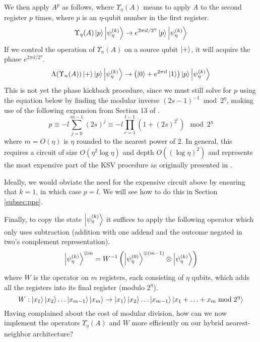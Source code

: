 We then apply $A^p$ as follows, where $\Upsilon_{\eta}(A)$ means to
apply $A$ to the second register $p$ times, where $p$ is an $\eta$-qubit
number in the first register.
%
\begin{equation}
\Upsilon_{\eta}(A) \left\vert{p}\right\rangle\left\vert{\psi_{\eta}^{(k)}}\right\rangle \rightarrow
e^{2\pi i l/2^{\eta}} \left\vert{p}\right\rangle\left\vert{\psi_{\eta}^{(k)}}\right\rangle
\label{eqn:upsilon}
\end{equation}
%
If we control the operation of $\Upsilon_n(A)$ on a source qubit $\left\vert{+}\right\rangle$,
it will acquire the phase $e^{2\pi i l/2^{\eta}}$.
%
\begin{equation}
\Lambda(\Upsilon_n(A))\left\vert{+}\right\rangle\left\vert{p}\right\rangle\left\vert{\psi_{\eta}^{(k)}}\right\rangle \rightarrow
\left( \left\vert{0}\right\rangle + e^{2\pi i l}\left\vert{1}\right\rangle \right) \left\vert{p}\right\rangle\left\vert{\psi_{\eta}^{(k)}}\right\rangle
\end{equation}
%
This is not yet the phase kickback procedure, since
we must still solve for $p$ using the equation below by finding the
modular inverse $(2s - 1)^{-1} \bmod 2^{\eta}$,
making use of the following expansion from Section 13
of \cite{Kitaev2002}.
%
\begin{equation}
p \equiv -l\sum_{j=0}^{m-1} (2s)^j \equiv -l \prod_{r=1}^{t-1}\left(1 + (2s)^{2^r}\right) \mod 2^{\eta}
\end{equation}
%
where $m = O(\eta)$ is $\eta$ rounded to the nearest power of $2$.  In general,
this requires a circuit of size $O(\eta^2 \log \eta)$ and depth $O((\log \eta)^2)$ and
represents the most expensive part of the KSV procedure as originally
presented in \cite{Kitaev2002}.

Ideally, we would obviate the need for the expensive circuit above
by ensuring that $k=1$, in which case
$p = l$. We will see how to do this in Section \ref{subsec:ppe}.

Finally, to copy the state $\left\vert{\psi_{\eta}^{(k)}}\right\rangle$ it suffices to apply the following
operator which only uses subtraction (addition with one addend and the
outcome negated in two's complement representation).
%
\begin{equation}
\left\vert{\psi_{\eta}^{(k)}}\right\rangle^{\otimes m} = W^{-1}\left( \left\vert{\psi_{\eta}^{(0)}}\right\rangle^{\otimes(m-1)} \otimes \left\vert{\psi_{\eta}^{(k)}}\right\rangle \right)
\end{equation}
%
where $W$ is the operator on $m$ registers, each consisting of $\eta$ qubits,
which adds all the registers into its final register (modulo $2^{\eta}$).
%
\begin{equation}
W : \left\vert{x_1}\right\rangle\left\vert{x_2}\right\rangle\ldots\left\vert{x_{m-1}}\right\rangle\left\vert{x_m}\right\rangle \rightarrow
 \left\vert{x_1}\right\rangle\left\vert{x_2}\right\rangle\ldots\left\vert{x_{m-1}}\right\rangle\left\vert{x_1+\ldots+x_m \bmod 2^{\eta}}\right\rangle
\end{equation}
%
Having complained about the cost of modular division, how can we now
implement the operators $\Upsilon_{\eta}(A)$ and $W$ more efficiently on our
hybrid nearest-neighbor architecture?